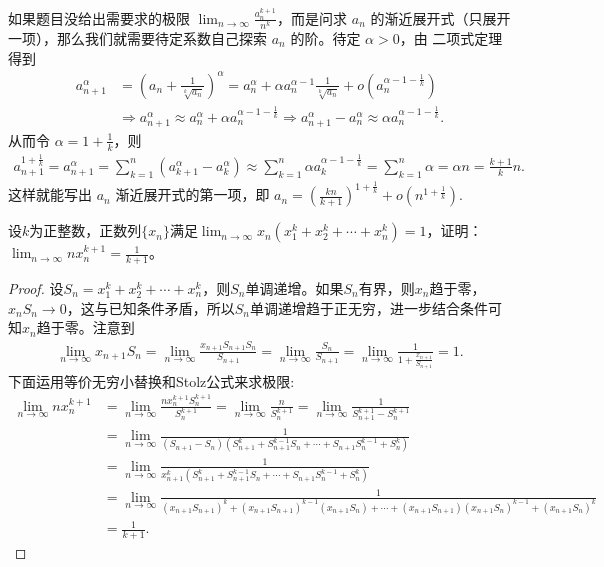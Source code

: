 \documentclass[../../main.tex]{subfiles}%
\begin{document}
\begin{remark}
如果题目没给出需要求的极限 \(\lim_{n\rightarrow \infty} \frac{a_{n}^{k + 1}}{n^k}\)，而是问求 \(a_n\) 的渐近展开式（只展开一项），那么我们就需要待定系数自己探索 \(a_n\) 的阶。待定 \(\alpha>0\)，由 二项式定理得到
\begin{align*}
a_{n+1}^{\alpha}&=\left( a_n+\frac{1}{\sqrt[k]{a_n}} \right) ^{\alpha}=a_{n}^{\alpha}+\alpha a_{n}^{\alpha -1}\frac{1}{\sqrt[k]{a_n}}+o\left( a_{n}^{\alpha -1-\frac{1}{k}} \right)\\
&\Rightarrow a_{n+1}^{\alpha}\approx a_{n}^{\alpha}+\alpha a_{n}^{\alpha -1-\frac{1}{k}}\Rightarrow a_{n+1}^{\alpha}-a_{n}^{\alpha}\approx \alpha a_{n}^{\alpha -1-\frac{1}{k}}.
\end{align*}
从而令 \(\alpha = 1+\frac{1}{k}\)，则
\begin{align*}
a_{n+1}^{1+\frac{1}{k}}=a_{n+1}^{\alpha}=\sum_{k=1}^n{\left( a_{k+1}^{\alpha}-a_{k}^{\alpha} \right)}\approx \sum_{k=1}^n{\alpha a_{k}^{\alpha -1-\frac{1}{k}}}=\sum_{k=1}^n{\alpha}=\alpha n=\frac{k+1}{k}n.
\end{align*}
这样就能写出 \(a_n\) 渐近展开式的第一项，即 \(a_n=\left( \frac{kn}{k+1} \right) ^{1+\frac{1}{k}}+o\left( n^{1+\frac{1}{k}} \right) \).
\end{remark}

\begin{example}
设\(k\)为正整数，正数列\(\{x_n\}\)满足\(\lim_{n\rightarrow\infty}x_n(x_1^k + x_2^k+\cdots+x_n^k)=1\)，证明：\(\lim_{n\rightarrow\infty}nx_n^{k + 1}=\frac{1}{k + 1}\)。
\end{example}
\begin{proof}
设\(S_n = x_1^k + x_2^k+\cdots+x_n^k\)，则\(S_n\)单调递增。如果\(S_n\)有界，则\(x_n\)趋于零，\(x_nS_n\rightarrow0\)，这与已知条件矛盾，所以\(S_n\)单调递增趋于正无穷，进一步结合条件可知\(x_n\)趋于零。注意到
\begin{align*}
\lim_{n\rightarrow\infty}x_{n + 1}S_n=\lim_{n\rightarrow\infty}\frac{x_{n + 1}S_{n + 1}S_n}{S_{n + 1}}=\lim_{n\rightarrow\infty}\frac{S_n}{S_{n + 1}}=\lim_{n\rightarrow\infty}\frac{1}{1+\frac{x_{n + 1}}{S_{n + 1}}}=1.
\end{align*}
下面运用等价无穷小替换和Stolz公式来求极限:
\begin{align*}
\lim_{n\rightarrow\infty}nx_n^{k + 1}&=\lim_{n\rightarrow\infty}\frac{nx_n^{k + 1}S_n^{k + 1}}{S_n^{k + 1}}=\lim_{n\rightarrow\infty}\frac{n}{S_n^{k + 1}}=\lim_{n\rightarrow\infty}\frac{1}{S_{n + 1}^{k + 1}-S_n^{k + 1}}\\
&=\lim_{n\rightarrow\infty}\frac{1}{(S_{n + 1}-S_n)(S_{n + 1}^k + S_{n + 1}^{k - 1}S_n+\cdots+S_{n + 1}S_n^{k - 1}+S_n^k)}\\
&=\lim_{n\rightarrow\infty}\frac{1}{x_{n + 1}^{k}(S_{n + 1}^k + S_{n + 1}^{k - 1}S_n+\cdots+S_{n + 1}S_n^{k - 1}+S_n^k)}\\
&=\lim_{n\rightarrow\infty}\frac{1}{(x_{n + 1}S_{n + 1})^k+(x_{n + 1}S_{n + 1})^{k - 1}(x_{n + 1}S_n)+\cdots+(x_{n + 1}S_{n + 1})(x_{n + 1}S_n)^{k - 1}+(x_{n + 1}S_n)^k}\\
&=\frac{1}{k + 1}.
\end{align*}
\end{proof}
\end{document}
